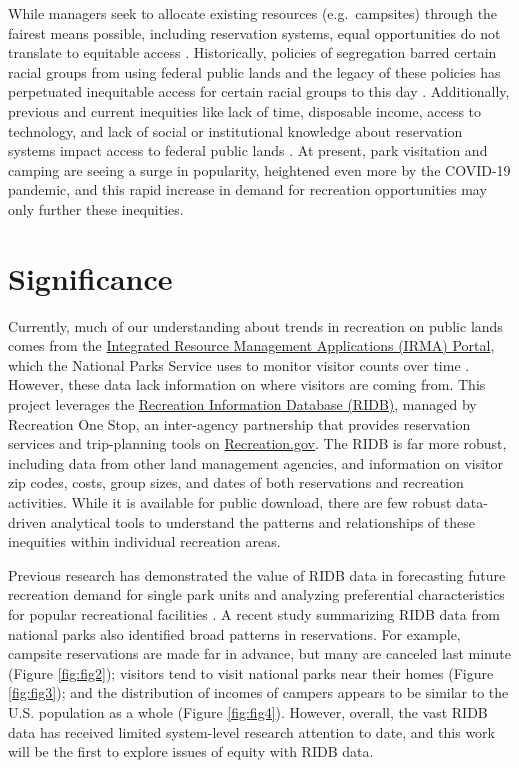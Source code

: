 \documentclass[
  11 pt,
  openany]{book}
\begin{document}
While managers seek to allocate existing resources (e.g.~campsites) through the fairest means possible, including reservation systems, equal opportunities do not translate to equitable access \citep{Shelby1989}. Historically, policies of segregation barred certain racial groups from using federal public lands and the legacy of these policies has perpetuated inequitable access for certain racial groups to this day \citep{Xiao2021}. Additionally, previous and current inequities like lack of time, disposable income, access to technology, and lack of social or institutional knowledge about reservation systems impact access to federal public lands \citep{Scott2018}. At present, park visitation and camping are seeing a surge in popularity, heightened even more by the COVID-19 pandemic, and this rapid increase in demand for recreation opportunities may only further these inequities.

\hypertarget{significance}{%
\section{Significance}\label{significance}}

Currently, much of our understanding about trends in recreation on public lands comes from the \href{https://irma.nps.gov/Portal/}{Integrated Resource Management Applications (IRMA) Portal}, which the National Parks Service uses to monitor visitor counts over time \citep{Bergstrom2020}. However, these data lack information on where visitors are coming from. This project leverages the \href{https://ridb.recreation.gov/landing}{Recreation Information Database (RIDB)}, managed by Recreation One Stop, an inter-agency partnership that provides reservation services and trip-planning tools on \href{https://www.recreation.gov/}{Recreation.gov}. The RIDB is far more robust, including data from other land management agencies, and information on visitor zip codes, costs, group sizes, and dates of both reservations and recreation activities. While it is available for public download, there are few robust data-driven analytical tools to understand the patterns and relationships of these inequities within individual recreation areas.

Previous research has demonstrated the value of RIDB data in forecasting future recreation demand for single park units \citep{Rice2019} and analyzing preferential characteristics for popular recreational facilities \citep{Rice2021}. A recent study summarizing RIDB data from national parks \citep{Walls2018} also identified broad patterns in reservations. For example, campsite reservations are made far in advance, but many are canceled last minute (Figure \ref{fig:fig2}); visitors tend to visit national parks near their homes (Figure \ref{fig:fig3}); and the distribution of incomes of campers appears to be similar to the U.S. population as a whole (Figure \ref{fig:fig4}). However, overall, the vast RIDB data has received limited system-level research attention to date, and this work will be the first to explore issues of equity with RIDB data.
\end{document}
